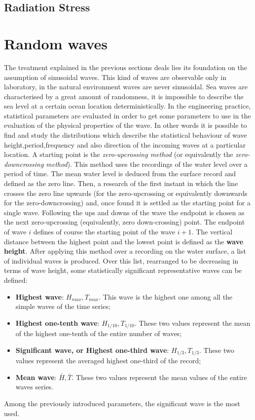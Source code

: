 \subsection{Radiation Stress}\label{Rad_stress}
\section{Random waves}\label{Rand_sea}
The treatment explained in the previous sections deals lies its foundation on the assumption of sinusoidal waves. This kind of waves are observable only in laboratory, in the natural environment waves are never sinusoidal. Sea waves are characterised by a great amount of randomness, it is impossible to describe the sea level at a certain ocean location deterministically. In the engineering practice, statistical parameters are evaluated in order to get some parameters to use in the evaluation of the physical properties of the wave. In other words it is possible to find and study the distributions which describe the statistical behaviour of wave height,period,frequency and also direction of the incoming waves at a particular location. A starting point is the \textit{zero-upcrossing method} (or equivalently the \textit{zero-downcrossing method}). This method uses the recordings of the water level over a period of time. The mean water level is deduced from the surface record and defined as the zero line. Then, a research of the first instant in which the line crosses the zero line upwards (for the zero-upcrossing or equivalently downwards for the zero-downcrossing) and, once found it is settled as the starting point for a single wave. Following the ups and downs of the wave the endpoint is chosen as the next zero-upcrossing (equivalently, zero down-crossing) point. The endpoint of wave $i$ defines of course the starting point of the wave $i+1$. The vertical distance between the highest point and the lowest point is defined as the \textbf{wave height}. After applying this method over a recording on the water surface, a list of individual waves is produced. Over this list, rearranged to be decreasing in terms of wave height, some statistically significant representative waves can be defined:
\begin{itemize}
\item \textbf{Highest wave}: $H_{max}, T_{max}$. This wave is the highest one among all the simple waves of the time series;
\item \textbf{Highest one-tenth wave}: $H_{1/10}, T_{1/10}$. These two values represent the mean of the highest one-tenth of the entire number of waves;
\item \textbf{Significant wave, or Highest one-third wave}: $H_{1/3}, T_{1/3}$. These two values represent the averaged highest one-third of the record;
\item \textbf{Mean wave}: $\bar{H}, \bar{T}$. These two values represent the mean values of the entire waves series.
\end{itemize}
Among the previously introduced parameters, the significant wave is the most used.



